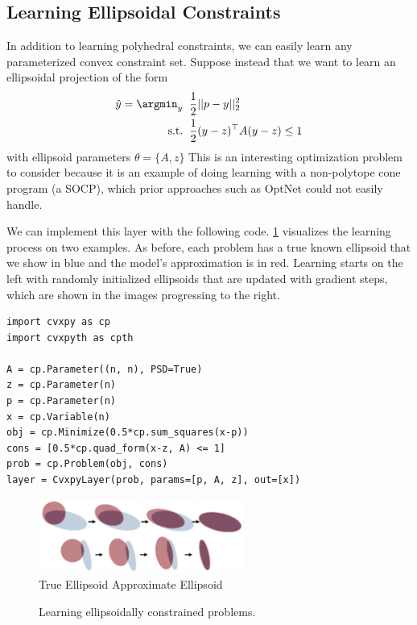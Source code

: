 \newpage
\subsection{Learning Ellipsoidal Constraints}
In addition to learning polyhedral constraints, we can easily
learn any parameterized convex constraint set.
Suppose instead that we want to learn an ellipsoidal
projection of the form
\begin{align*}
\hat y = \argmin_y\;\; &\frac{1}{2}||p-y||_2^2  \\
 {\rm s.t.}\;\; & \frac{1}{2}(y-z)^\top A(y-z) \leq 1
\end{align*}
with ellipsoid parameters $\theta=\{A,z\}$
This is an interesting optimization problem to consider because
it is an example of doing learning with a non-polytope
cone program (a SOCP), which prior approaches such as OptNet
could not easily handle.

We can implement this layer with the following code.
\cref{fig:ellipsoid-results} visualizes the learning process
on two examples.
As before, each problem has a true known ellipsoid that we show in blue
and the model's approximation is in red.
Learning starts on the left with randomly initialized
ellipsoids that are updated with gradient steps,
which are shown in the images progressing to the right.

\begin{lstlisting}
import cvxpy as cp
import cvxpyth as cpth

A = cp.Parameter((n, n), PSD=True)
z = cp.Parameter(n)
p = cp.Parameter(n)
x = cp.Variable(n)
obj = cp.Minimize(0.5*cp.sum_squares(x-p))
cons = [0.5*cp.quad_form(x-z, A) <= 1]
prob = cp.Problem(obj, cons)
layer = CvxpyLayer(prob, params=[p, A, z], out=[x])
\end{lstlisting}

\begin{figure}[t]
  \centering
  \includegraphics[width=0.6\textwidth]{ellipsoid-frames.png} \\
   True Ellipsoid \enskip
   Approximate Ellipsoid
  \caption{
    Learning ellipsoidally constrained problems.
  }
  \label{fig:ellipsoid-results}
\end{figure}

